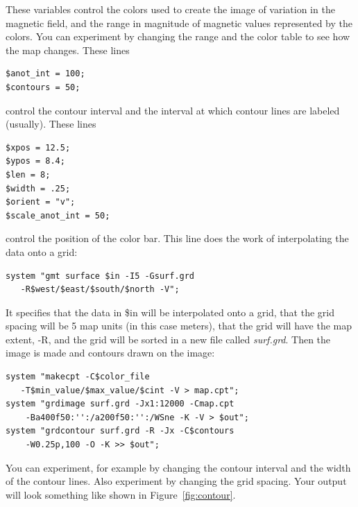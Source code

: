 \documentclass[letterpaper,10pt]{report}
\begin{document}
These variables control the colors used to create the image of variation in the magnetic field, and the range in magnitude of magnetic values represented by the colors. You can experiment by changing the range and the color table to see how the map changes. These lines
\begin{verbatim}
$anot_int = 100;
$contours = 50;
\end{verbatim}
control the contour interval and the interval at which contour lines are labeled (usually). These lines
\begin{verbatim}
$xpos = 12.5;
$ypos = 8.4;
$len = 8;
$width = .25;
$orient = "v";
$scale_anot_int = 50;
\end{verbatim}
control the position of the color bar. This line does the work of interpolating the data onto a grid:
\begin{verbatim}
system "gmt surface $in -I5 -Gsurf.grd 
   -R$west/$east/$south/$north -V";
\end{verbatim}
It specifies that the data in \$in will be interpolated onto a grid, that the grid spacing will be 5 map units (in this case meters), that the grid will have the map extent, -R, and the grid will be sorted in a new file called {\it surf.grd}. Then the image is made and contours drawn on the image:
\begin{verbatim}
system "makecpt -C$color_file 
   -T$min_value/$max_value/$cint -V > map.cpt";
system "grdimage surf.grd -Jx1:12000 -Cmap.cpt 
    -Ba400f50:'':/a200f50:'':/WSne -K -V > $out";
system "grdcontour surf.grd -R -Jx -C$contours 
    -W0.25p,100 -O -K >> $out";
\end{verbatim}
You can experiment, for example by changing the contour interval and the width of the contour lines. Also experiment by changing the grid spacing. Your output will look something like shown in Figure~\ref{fig:contour}. 
\end{document}

